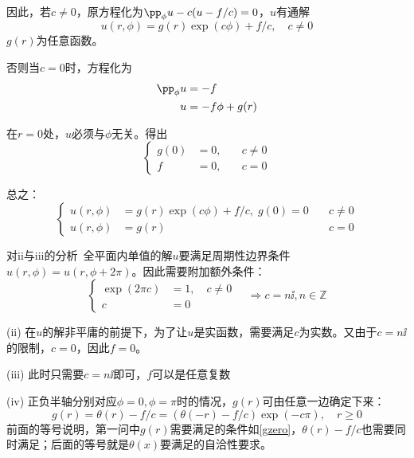 \documentclass[a4paper,12pt]{article}
\newcommand{\emp}[1]{{\heiti #1}}
\begin{document}
因此，若$c\neq 0$，原方程化为$\pp_\phi u-c(u-f/c)=0$，$u$有通解%
\begin{equation}
u(r,\phi)=g(r)\exp(c\phi)+f/c,\quad c\neq 0
\end{equation}
$g(r)$为任意函数。

否则当$c=0$时，方程化为
\begin{align}
 \pp_\phi u&=-f\newline\\
 u&=-f\phi+g(r)
\end{align}

在$r=0$处，$u$必须与$\phi$无关。得出
\begin{equation}
\left\{
\begin{aligned}
  g(0)&=0, \quad &c\neq 0\\
  f&=0, \quad &c=0
\end{aligned}\right.
\label{gzero}
\end{equation}

总之：
\begin{equation}\boxed{
\left\{
\begin{aligned}
 u(r,\phi)&=g(r)\exp(c\phi)+f/c,\; g(0)=0\quad &c\neq 0\\
 u(r,\phi)&=g(r)\quad &c=0
\end{aligned}\right.}
\end{equation}

\emp{对ii与iii的分析}~全平面内单值的解$u$要满足周期性边界条件$u(r,\phi)=u(r,\phi+2\pi)$。因此需要附加额外条件：
\begin{equation}
\left\{
\begin{aligned}
 \exp(2\pi c)&=1,\quad c\neq 0\\
 c&=0
\end{aligned}
\right.\quad\Rightarrow c=n\ii, n\in \mathbb{Z}
\end{equation}

(ii) 在$u$的解非平庸的前提下，为了让$u$是实函数，需要满足$c$为实数。又由于$c=n\ii$的限制，$c=0$，因此$f=0$。

(iii) 此时只需要$c=n\ii$即可，$f$可以是任意复数

(iv) 正负半轴分别对应$\phi=0, \phi=\pi$时的情况，$g(r)$可由任意一边确定下来：
\begin{equation}
g(r)=\theta(r)-f/c=(\theta(-r)-f/c)\exp(-c\pi),\quad r\geq 0
\end{equation}
前面的等号说明，第一问中$g(r)$需要满足的条件如\ref{gzero}，$\theta(r)-f/c$也需要同时满足；后面的等号就是$\theta(x)$要满足的自洽性要求。
\end{document}
